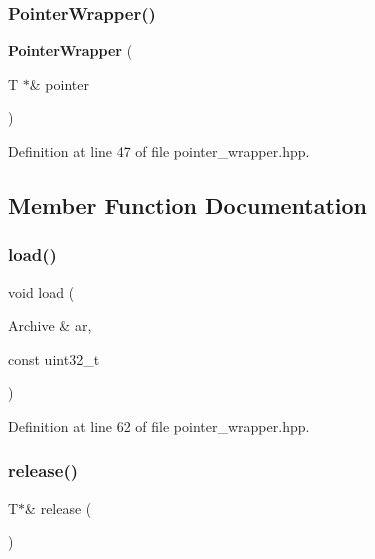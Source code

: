 \subsubsection{Pointer\+Wrapper()}
{\footnotesize\ttfamily \textbf{ Pointer\+Wrapper} (\begin{DoxyParamCaption}\item[{T $\ast$\&}]{pointer }\end{DoxyParamCaption})\hspace{0.3cm}{\ttfamily [inline]}}



Definition at line 47 of file pointer\+\_\+wrapper.\+hpp.



\subsection{Member Function Documentation}
\mbox{\label{classcereal_1_1PointerWrapper_a2c74fd23efa75fae660603e36f4d03ac}} 
\subsubsection{load()}
{\footnotesize\ttfamily void load (\begin{DoxyParamCaption}\item[{Archive \&}]{ar,  }\item[{const uint32\+\_\+t}]{ }\end{DoxyParamCaption})\hspace{0.3cm}{\ttfamily [inline]}}



Definition at line 62 of file pointer\+\_\+wrapper.\+hpp.

\mbox{\label{classcereal_1_1PointerWrapper_ad56c5f39662b211a09253c751262fdc4}} 
\subsubsection{release()}
{\footnotesize\ttfamily T$\ast$\& release (\begin{DoxyParamCaption}{ }\end{DoxyParamCaption})\hspace{0.3cm}{\ttfamily [inline]}}




